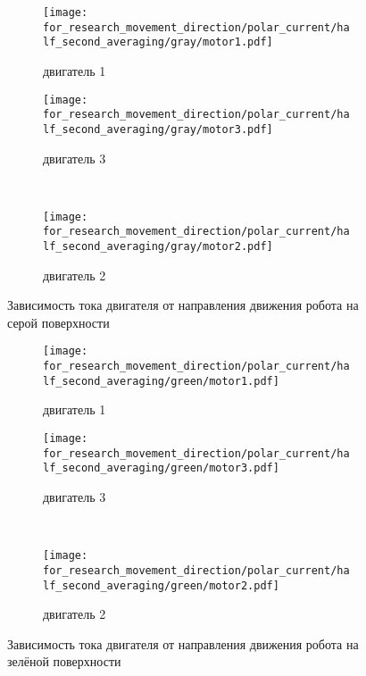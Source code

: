 \begin{figure}[H]
    \centering
    \begin{subfigure}{0.49\textwidth}
        \centering
        \texttt{[image: for\_research\_movement\_direction/polar\_current/half\_second\_averaging/gray/motor1.pdf]}
        \caption{двигатель 1}
    \end{subfigure}
    \hspace{0.005\textwidth}
    \begin{subfigure}{0.49\textwidth}
        \centering
        \texttt{[image: for\_research\_movement\_direction/polar\_current/half\_second\_averaging/gray/motor3.pdf]}
        \caption{двигатель 3}
    \end{subfigure} \\
    \vspace{4pt}
    \centering
    \begin{subfigure}{0.49\textwidth}
        \centering
        \texttt{[image: for\_research\_movement\_direction/polar\_current/half\_second\_averaging/gray/motor2.pdf]}
        \caption{двигатель 2}
    \end{subfigure}
    \caption{Зависимость тока двигателя от направления движения робота на серой поверхности}
\end{figure}

\begin{figure}[H]
    \centering
    \begin{subfigure}{0.49\textwidth}
        \centering
        \texttt{[image: for\_research\_movement\_direction/polar\_current/half\_second\_averaging/green/motor1.pdf]}
        \caption{двигатель 1}
    \end{subfigure}
    \hspace{0.005\textwidth}
    \begin{subfigure}{0.49\textwidth}
        \centering
        \texttt{[image: for\_research\_movement\_direction/polar\_current/half\_second\_averaging/green/motor3.pdf]}
        \caption{двигатель 3}
    \end{subfigure} \\
    \vspace{4pt}
    \centering
    \begin{subfigure}{0.49\textwidth}
        \centering
        \texttt{[image: for\_research\_movement\_direction/polar\_current/half\_second\_averaging/green/motor2.pdf]}
        \caption{двигатель 2}
    \end{subfigure}
    \caption{Зависимость тока двигателя от направления движения робота на зелёной поверхности}
\end{figure}

